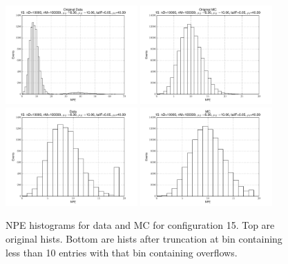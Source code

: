  \begin{figure}[htbp] \begin{center} 
\includegraphics[width=0.45\textwidth]{../FIGURES/15/FIG_Original_Data.pdf} 
\includegraphics[width=0.45\textwidth]{../FIGURES/15/FIG_Original_MC.pdf} 
\includegraphics[width=0.45\textwidth]{../FIGURES/15/FIG_Data.pdf} 
\includegraphics[width=0.45\textwidth]{../FIGURES/15/FIG_MC.pdf} 
\caption{NPE histograms for data and MC for configuration 15. Top are original hists. Bottom are hists after truncation at bin containing less than 10 entries with that bin containing overflows.} 
\label{tab:npe_15} 
\end{center} \end{figure} 

 